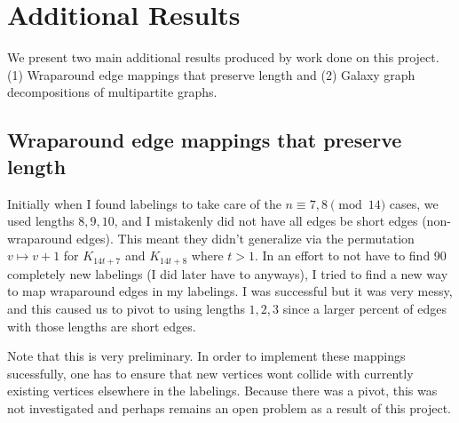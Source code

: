\chapter{Additional Results} \label{chap:Additional Results}

We present two main additional results produced by work done on this project. (1) Wraparound edge mappings that preserve length and (2) Galaxy graph decompositions of multipartite graphs.

\section{Wraparound edge mappings that preserve length}
Initially when I found labelings to take care of the $n\equiv 7,8\pmod{14}$ cases, we used lengths $8,9,10$, and I mistakenly did not have all edges be short edges (non-wraparound edges). This meant they didn't generalize via the permutation $v\mapsto v+1$ for $K_{14t+7}$ and $K_{14t+8}$ where $t>1$. In an effort to not have to find 90 completely new labelings (I did later have to anyways), I tried to find a new way to map wraparound edges in my labelings. I was successful but it was very messy, and this caused us to pivot to using lengths $1,2,3$ since a larger percent of edges with those lengths are short edges.

Note that this is very preliminary. In order to implement these mappings sucessfully, one has to ensure that new vertices wont collide with currently existing vertices elsewhere in the labelings. Because there was a pivot, this was not investigated and perhaps remains an open problem as a result of this project.







